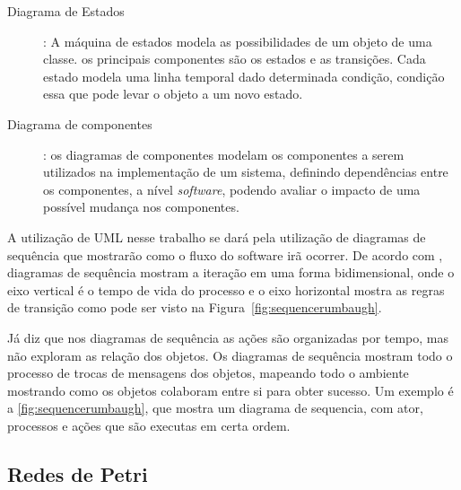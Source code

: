 \begin{description}
    
    \item[Diagrama de Estados]: A máquina de estados modela as possibilidades de um objeto de uma classe. os principais componentes são os estados e as transições. Cada estado modela uma linha temporal dado determinada condição, condição essa que pode levar o objeto a um novo estado.

      
    
    \item[Diagrama de componentes]: os diagramas de componentes modelam os componentes a serem utilizados na implementação de um sistema, definindo dependências entre os componentes, a nível \textit{software}, podendo avaliar o impacto de uma possível mudança nos componentes.

    
\end{description}



A utilização de UML nesse trabalho se dará pela utilização de diagramas de sequência que mostrarão como o fluxo do software irã ocorrer. De acordo com , diagramas de sequência mostram a iteração em uma forma bidimensional, onde o eixo vertical é o tempo de vida do processo e o eixo horizontal mostra as regras de transição como pode ser visto na Figura~\ref{fig:sequencerumbaugh}. %

Já  diz que nos diagramas de sequência as ações são organizadas por tempo, mas não exploram as relação dos objetos. Os diagramas de sequência mostram todo o processo de trocas de mensagens dos objetos, mapeando todo o ambiente mostrando como os objetos colaboram entre si para obter sucesso. Um exemplo é a \autoref{fig:sequencerumbaugh}, que mostra um diagrama de sequencia, com ator, processos e ações que são executas em certa ordem. 





\subsection{Redes de Petri}

